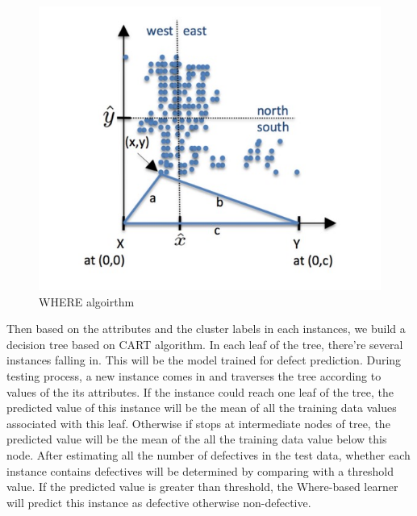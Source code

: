 \begin{figure}[!ht]
\includegraphics[scale=0.5]{where.png}
\caption{WHERE algoirthm }
\label{Where}
\end{figure}
Then based on the attributes and the cluster labels in each instances,  we build a 
decision tree based on CART algorithm. In each leaf of the tree, there're several instances 
falling in. This will be the model trained for defect prediction. During testing process, a new 
instance comes in and traverses the tree according to 
values of the its attributes. If the instance could reach one leaf of the tree, the predicted value 
of this instance will be the mean  of all the training data values associated with this leaf. 
Otherwise if stops at intermediate nodes of tree, the predicted value will be the mean of the all 
the training data value below this node. After estimating all the number of defectives in the test 
data, whether each instance contains defectives will be determined by comparing with a threshold value. If the predicted value is greater than threshold, the Where-based learner will predict this instance as defective otherwise non-defective.



